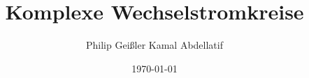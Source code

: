 \documentclass[10pt, aspectratio=169]{beamer}
\title{Komplexe Wechselstromkreise}
\date{\today}
\author{Philip Geißler \quad Kamal Abdellatif}
\begin{document}
\begin{frame}
	\titlepage
\end{frame}

\centering
\end{document}
